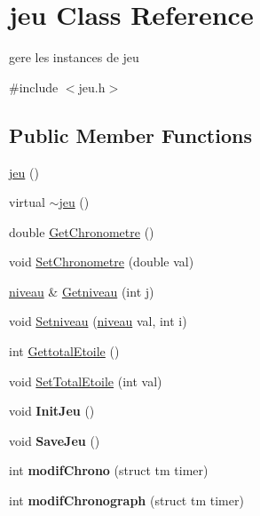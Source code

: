 \hypertarget{classjeu}{}\section{jeu Class Reference}
\label{classjeu}


gere les instances de jeu  




{\ttfamily \#include $<$jeu.\+h$>$}

\subsection*{Public Member Functions}
\begin{DoxyCompactItemize}
\item 
\hyperlink{classjeu_a38513a7bfd0a7ea4e3a5612da2856016}{jeu} ()
\item 
virtual \hyperlink{classjeu_a55385a33ef40e0579eb3a3634566c4a8}{$\sim$jeu} ()
\item 
double \hyperlink{classjeu_ae52ca2a3e15e800c949ea1a8928b56bc}{Get\+Chronometre} ()
\item 
void \hyperlink{classjeu_a8e8b72cb902c9907b3178a8cb1cc1bfe}{Set\+Chronometre} (double val)
\item 
\hyperlink{classniveau}{niveau} \& \hyperlink{classjeu_af131cda091cb76267a703144a0fac1c4}{Getniveau} (int j)
\item 
void \hyperlink{classjeu_a03a2ef6938f3741425f93003d36f8843}{Setniveau} (\hyperlink{classniveau}{niveau} val, int i)
\item 
int \hyperlink{classjeu_a76b8b62a71cf8f34c56774ee54be306e}{Gettotal\+Etoile} ()
\item 
void \hyperlink{classjeu_a32a2fbd405a880681a0f81f19ddd5d9e}{Set\+Total\+Etoile} (int val)
\item 
void {\bfseries Init\+Jeu} ()\hypertarget{classjeu_a20847bf90be69aabbf0d17b8774192fb}{}\label{classjeu_a20847bf90be69aabbf0d17b8774192fb}

\item 
void {\bfseries Save\+Jeu} ()\hypertarget{classjeu_aa7e6217b0d723ff51d942649dea5aa26}{}\label{classjeu_aa7e6217b0d723ff51d942649dea5aa26}

\item 
int {\bfseries modif\+Chrono} (struct tm timer)\hypertarget{classjeu_a06c149bc7f328b62582be80e2d66e35a}{}\label{classjeu_a06c149bc7f328b62582be80e2d66e35a}

\item 
int {\bfseries modif\+Chronograph} (struct tm timer)\hypertarget{classjeu_a811b366c2e6c2f72205fe20fe36ab20c}{}\label{classjeu_a811b366c2e6c2f72205fe20fe36ab20c}


\end{DoxyCompactItemize}
